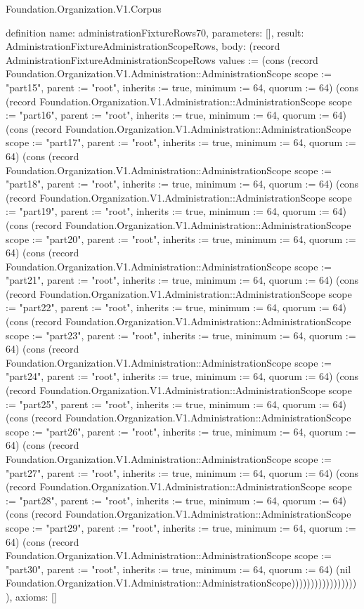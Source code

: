\begin{lexlean}{Foundation.Organization.V1.Corpus}
\begin{semanticmodule}
definition{
  name: administrationFixtureRows70,
  parameters: [],
  result: AdministrationFixtureAdministrationScopeRows,
  body: (record AdministrationFixtureAdministrationScopeRows {values := (cons (record Foundation.Organization.V1.Administration::AdministrationScope {scope := "part15", parent := "root", inherits := true, minimum := 64, quorum := 64}) (cons (record Foundation.Organization.V1.Administration::AdministrationScope {scope := "part16", parent := "root", inherits := true, minimum := 64, quorum := 64}) (cons (record Foundation.Organization.V1.Administration::AdministrationScope {scope := "part17", parent := "root", inherits := true, minimum := 64, quorum := 64}) (cons (record Foundation.Organization.V1.Administration::AdministrationScope {scope := "part18", parent := "root", inherits := true, minimum := 64, quorum := 64}) (cons (record Foundation.Organization.V1.Administration::AdministrationScope {scope := "part19", parent := "root", inherits := true, minimum := 64, quorum := 64}) (cons (record Foundation.Organization.V1.Administration::AdministrationScope {scope := "part20", parent := "root", inherits := true, minimum := 64, quorum := 64}) (cons (record Foundation.Organization.V1.Administration::AdministrationScope {scope := "part21", parent := "root", inherits := true, minimum := 64, quorum := 64}) (cons (record Foundation.Organization.V1.Administration::AdministrationScope {scope := "part22", parent := "root", inherits := true, minimum := 64, quorum := 64}) (cons (record Foundation.Organization.V1.Administration::AdministrationScope {scope := "part23", parent := "root", inherits := true, minimum := 64, quorum := 64}) (cons (record Foundation.Organization.V1.Administration::AdministrationScope {scope := "part24", parent := "root", inherits := true, minimum := 64, quorum := 64}) (cons (record Foundation.Organization.V1.Administration::AdministrationScope {scope := "part25", parent := "root", inherits := true, minimum := 64, quorum := 64}) (cons (record Foundation.Organization.V1.Administration::AdministrationScope {scope := "part26", parent := "root", inherits := true, minimum := 64, quorum := 64}) (cons (record Foundation.Organization.V1.Administration::AdministrationScope {scope := "part27", parent := "root", inherits := true, minimum := 64, quorum := 64}) (cons (record Foundation.Organization.V1.Administration::AdministrationScope {scope := "part28", parent := "root", inherits := true, minimum := 64, quorum := 64}) (cons (record Foundation.Organization.V1.Administration::AdministrationScope {scope := "part29", parent := "root", inherits := true, minimum := 64, quorum := 64}) (cons (record Foundation.Organization.V1.Administration::AdministrationScope {scope := "part30", parent := "root", inherits := true, minimum := 64, quorum := 64}) (nil Foundation.Organization.V1.Administration::AdministrationScope)))))))))))))))))}),
  axioms: []
}


\end{semanticmodule}
\end{lexlean}

